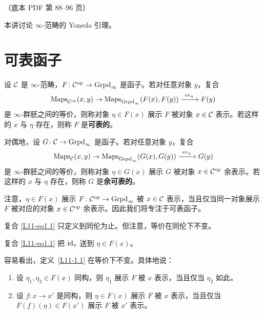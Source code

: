 \begin{center}\small\color{black!55}（底本 PDF 第 88–96 页）\end{center}

本讲讨论 $\infty$-范畴的 Yoneda 引理。

\section{可表函子}

\begin{definition}\label{L11-1.1}
设 $\mathcal{C}$ 是 $\infty$-范畴，$F\colon\mathcal{C}^{\mathrm{op}}\to\operatorname{Grpd}_\infty$ 是函子。若对任意对象 $y$，复合
\begin{equation}\label{L11-eq1.1}
\mathrm{Maps}_{\cC^{\op}}(x,y)\to\mathrm{Maps}_{\Grpd_\infty}(F(x),F(y))\xrightarrow{\ \mathrm{ev}_\eta\ }F(y)
\end{equation}
是 $\infty$-群胚之间的等价，则称对象 $\eta\in F(x)$ 展示 $F$ 被对象 $x\in\mathcal{C}$ 表示。若这样的 $x$ 与 $\eta$ 存在，则称 $F$ 是\textbf{可表的}。

对偶地，设 $G\colon\mathcal{C}\to\operatorname{Grpd}_\infty$ 是函子。若对任意对象 $y$，复合
\[
\mathrm{Maps}_{\cC}(x,y)\to\mathrm{Maps}_{\Grpd_\infty}(G(x),G(y))\xrightarrow{\ \mathrm{ev}_\eta\ }G(y)
\]
是 $\infty$-群胚之间的等价，则称对象 $\eta\in G(x)$ 展示 $G$ 被对象 $x\in\mathcal{C}^{\mathrm{op}}$ 余表示。若这样的 $x$ 与 $\eta$ 存在，则称 $G$ 是\textbf{余可表的}。
\end{definition}

\nitem\label{L11-1.2} 注意，$\eta\in F(x)$ 展示 $F\colon\mathcal{C}^{\mathrm{op}}\to\operatorname{Grpd}_\infty$ 被 $x\in\mathcal{C}$ 表示，当且仅当同一对象展示 $F$ 被对应的对象 $x\in\mathcal{C}^{\mathrm{op}}$ 余表示。因此我们将专注于可表函子。

\begin{remark}\label{L11-1.3}
复合 \eqref{L11-eq1.1} 只定义到同伦为止。但注意，等价在同伦下不变。
\end{remark}

\begin{remark}\label{L11-1.4}
复合 \eqref{L11-eq1.1} 把 $\operatorname{id}_x$ 送到 $\eta\in F(x)$。
\end{remark}

\nitem\label{L11-1.5} 容易看出，定义~\ref{L11-1.1} 在等价下不变。具体地说：
\begin{enumerate}[label=(\arabic*),leftmargin=2.4em,itemsep=0.1em]
\item 设 $\eta_1,\eta_2\in F(x)$ 同构，则 $\eta_1$ 展示 $F$ 被 $x$ 表示，当且仅当 $\eta_2$ 如此。
\item 设 $f\colon x\to x'$ 是同构，则 $\eta\in F(x)$ 展示 $F$ 被 $x$ 表示，当且仅当 $F(f)(\eta)\in F(x')$ 展示 $F$ 被 $x'$ 表示。
\end{enumerate}


